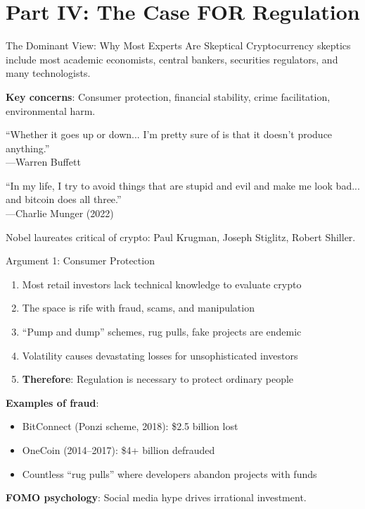 ﻿\documentclass[aspectratio=169,11pt]{beamer}
\begin{document}
\section{Part IV: The Case FOR Regulation}

\begin{frame}{The Dominant View: Why Most Experts Are Skeptical}
Cryptocurrency skeptics include most academic economists, central bankers, securities regulators, and many technologists.

\vspace{0.3em}
\textbf{Key concerns}: Consumer protection, financial stability, crime facilitation, environmental harm.

\begin{quotebox}
``Whether it goes up or down... I'm pretty sure of is that it doesn't produce anything.''\\
\hfill---Warren Buffett
\end{quotebox}

\begin{quotebox}
``In my life, I try to avoid things that are stupid and evil and make me look bad... and bitcoin does all three.''\\
\hfill---Charlie Munger (2022)
\end{quotebox}

Nobel laureates critical of crypto: Paul Krugman, Joseph Stiglitz, Robert Shiller.
\end{frame}

\begin{frame}{Argument 1: Consumer Protection}
\begin{argumentbox}
\begin{enumerate}
    \item Most retail investors lack technical knowledge to evaluate crypto
    \item The space is rife with fraud, scams, and manipulation
    \item ``Pump and dump'' schemes, rug pulls, fake projects are endemic
    \item Volatility causes devastating losses for unsophisticated investors
    \item \textbf{Therefore}: Regulation is necessary to protect ordinary people
\end{enumerate}
\end{argumentbox}

\vspace{0.3em}
\textbf{Examples of fraud}:
\begin{itemize}
    \item BitConnect (Ponzi scheme, 2018): \$2.5 billion lost
    \item OneCoin (2014--2017): \$4+ billion defrauded
    \item Countless ``rug pulls'' where developers abandon projects with funds
\end{itemize}

\textbf{FOMO psychology}: Social media hype drives irrational investment.
\end{frame}
\end{document}
